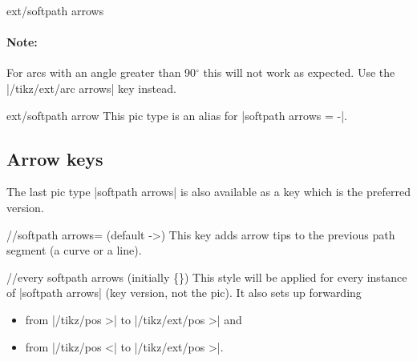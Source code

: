 \begin{multicols}{2}
\begin{pictype}{ext/softpath arrows}{}
  \paragraph{Note:} For arcs with an angle greater than 90${}^\circ$
    this will not work as expected. Use the |/tikz/ext/arc arrows| key instead.
\begin{codeexample}[preamble=\usetikzlibrary{bending, ext.arrows-plus}]
\end{codeexample}
\end{pictype}
\begin{pictype}{ext/softpath arrow}{}
  This pic type is an alias for |softpath arrows = -|.
\end{pictype}

\subsection{Arrow keys}
The last pic type |softpath arrows| is also available as a key
which is the preferred version.
\begin{key}{/\tikzext/softpath arrows= (default ->)}
This key adds arrow tips to the previous path segment (a curve or a line).

\begin{stylekey}{/\tikzext/every softpath arrows (initially \{\})}
This style will be applied for every instance of |softpath arrows| (key version, not the pic).
It also sets up forwarding
\begin{itemize}
  \item from |/tikz/pos >| to |/tikz/ext/pos >| and
  \item from |/tikz/pos <| to |/tikz/ext/pos >|.
\end{itemize}
\end{stylekey}
\end{key}


\end{multicols}
